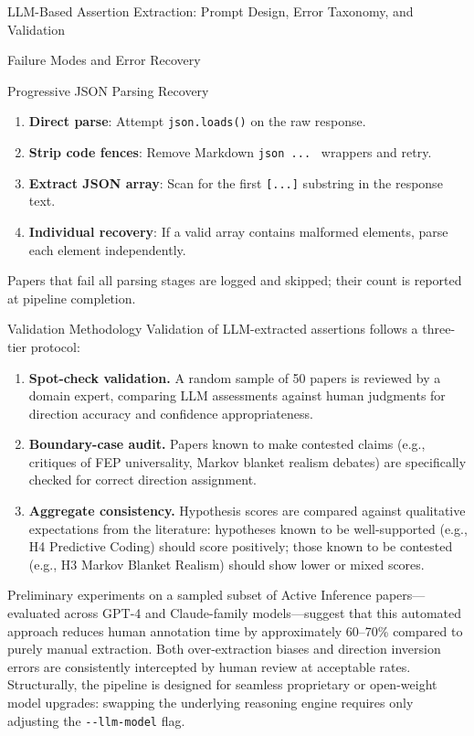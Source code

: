 \documentclass[
  ignorenonframetext,
]{beamer}
\providecommand{\tightlist}{%
  \setlength{\itemsep}{0pt}\setlength{\parskip}{0pt}}
\begin{document}
\begin{frame}[fragile]{LLM-Based Assertion Extraction: Prompt Design,
Error Taxonomy, and Validation \label{sec:extraction_pipeline}}
\begin{block}{Failure Modes and Error Recovery}
\begin{block}{Progressive JSON Parsing Recovery}
\begin{enumerate}
\tightlist
\item
  \textbf{Direct parse}: Attempt \texttt{json.loads()} on the raw
  response.
\item
  \textbf{Strip code fences}: Remove Markdown
  \texttt{\textasciigrave{}\textasciigrave{}\textasciigrave{}json\ ...\ \textasciigrave{}\textasciigrave{}\textasciigrave{}}
  wrappers and retry.
\item
  \textbf{Extract JSON array}: Scan for the first \texttt{{[}...{]}}
  substring in the response text.
\item
  \textbf{Individual recovery}: If a valid array contains malformed
  elements, parse each element independently.
\end{enumerate}

Papers that fail all parsing stages are logged and skipped; their count
is reported at pipeline completion.
\end{block}
\end{block}

\begin{block}{Validation Methodology}
\protect{}\label{validation-methodology}
Validation of LLM-extracted assertions follows a three-tier protocol:

\begin{enumerate}
\item
  \textbf{Spot-check validation.} A random sample of 50 papers is
  reviewed by a domain expert, comparing LLM assessments against human
  judgments for direction accuracy and confidence appropriateness.
\item
  \textbf{Boundary-case audit.} Papers known to make contested claims
  (e.g., critiques of FEP universality, Markov blanket realism debates)
  are specifically checked for correct direction assignment.
\item
  \textbf{Aggregate consistency.} Hypothesis scores are compared against
  qualitative expectations from the literature: hypotheses known to be
  well-supported (e.g., H4 Predictive Coding) should score positively;
  those known to be contested (e.g., H3 Markov Blanket Realism) should
  show lower or mixed scores.
\end{enumerate}

Preliminary experiments on a sampled subset of Active Inference
papers---evaluated across GPT-4 and Claude-family models---suggest that
this automated approach reduces human annotation time by approximately
60--70\% compared to purely manual extraction. Both over-extraction
biases and direction inversion errors are consistently intercepted by
human review at acceptable rates. Structurally, the pipeline is designed
for seamless proprietary or open-weight model upgrades: swapping the
underlying reasoning engine requires only adjusting the
\texttt{-\/-llm-model} flag.
\end{block}
\end{frame}
\end{document}
